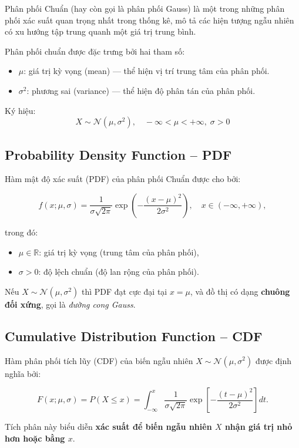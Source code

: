 Phân phối Chuẩn (hay còn gọi là phân phối Gauss) là một trong những phân phối xác suất quan trọng nhất trong thống kê, mô tả các hiện tượng ngẫu nhiên có xu hướng tập trung quanh một giá trị trung bình.  

Phân phối chuẩn được đặc trưng bởi hai tham số:
\begin{itemize}
    \item $\mu$: giá trị kỳ vọng (mean) — thể hiện vị trí trung tâm của phân phối.
    \item $\sigma^2$: phương sai (variance) — thể hiện độ phân tán của phân phối.
\end{itemize}
Ký hiệu:
\[
X \sim \mathcal{N}(\mu,\sigma^2), \quad -\infty < \mu < +\infty, \; \sigma > 0
\]


\subsection{Probability Density Function – PDF}

Hàm mật độ xác suất (PDF) của phân phối Chuẩn được cho bởi:

\[
f(x;\mu,\sigma) = \frac{1}{\sigma\sqrt{2\pi}}
\exp\left(-\frac{(x-\mu)^2}{2\sigma^2}\right), \quad x \in (-\infty, +\infty),
\]

trong đó:
\begin{itemize}
    \item \(\mu \in \mathbb{R}\): giá trị kỳ vọng (trung tâm của phân phối),
    \item \(\sigma > 0\): độ lệch chuẩn (độ lan rộng của phân phối).
\end{itemize}

Nếu \( X \sim \mathcal{N}(\mu,\sigma^2) \) thì PDF đạt cực đại tại \( x = \mu \), và đồ thị có dạng \textbf{chuông đối xứng}, gọi là \textit{đường cong Gauss}.


\subsection{Cumulative Distribution Function – CDF}

Hàm phân phối tích lũy (CDF) của biến ngẫu nhiên \( X \sim \mathcal{N}(\mu,\sigma^2) \) được định nghĩa bởi:

\[
F(x;\mu,\sigma) = P(X \le x) 
= \int_{-\infty}^x \frac{1}{\sigma\sqrt{2\pi}}
\exp\left[-\frac{(t-\mu)^2}{2\sigma^2}\right] dt.
\]

Tích phân này biểu diễn \textbf{xác suất để biến ngẫu nhiên \(X\) nhận giá trị nhỏ hơn hoặc bằng \(x\)}.

